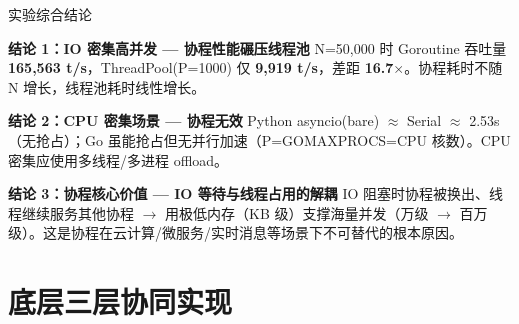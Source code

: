 \begin{frame}{实验综合结论}
  \begin{alertblock}{\bfseries 结论 1：IO 密集高并发 — 协程性能碾压线程池}
    N=50,000 时 Goroutine 吞吐量 \textbf{165,563 t/s}，ThreadPool(P=1000) 仅 \textbf{9,919 t/s}，差距 \textbf{16.7$\times$}。协程耗时不随 N 增长，线程池耗时线性增长。
  \end{alertblock}

  \vspace{0.3em}

  \begin{block}{\bfseries 结论 2：CPU 密集场景 — 协程无效}
    Python asyncio(bare) $\approx$ Serial $\approx$ 2.53s（无抢占）；Go 虽能抢占但无并行加速（P=GOMAXPROCS=CPU 核数）。CPU 密集应使用多线程/多进程 offload。
  \end{block}

  \vspace{0.3em}

  \begin{exampleblock}{\bfseries 结论 3：协程核心价值 — IO 等待与线程占用的解耦}
    IO 阻塞时协程被换出、线程继续服务其他协程 $\rightarrow$ 用极低内存（KB 级）支撑海量并发（万级 $\rightarrow$ 百万级）。这是协程在云计算/微服务/实时消息等场景下不可替代的根本原因。
  \end{exampleblock}
\end{frame}

\section{底层三层协同实现}

